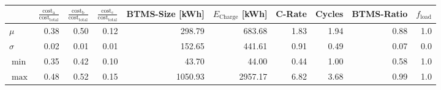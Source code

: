 \begin{tabular}{lrrrrrrrrr}
\toprule
{} &  $\frac{\text{cost}_\text{a}}{\text{cost}_\text{total}}$ &  $\frac{\text{cost}_\text{b}}{\text{cost}_\text{total}}$ &  $\frac{\text{cost}_\text{c}}{\text{cost}_\text{total}}$ &  BTMS-Size [\unit{\kWh}] &  $E_\text{Charge}$ [\unit{\kWh}] &  C-Rate &  Cycles &  BTMS-Ratio &  $f_\text{load}$ \\
\midrule
$\mu$    &                                               0.38 &                                               0.50 &                                               0.12 &                   298.79 &                           683.68 &    1.83 &    1.94 &        0.88 &              1.0 \\
$\sigma$ &                                               0.02 &                                               0.01 &                                               0.01 &                   152.65 &                           441.61 &    0.91 &    0.49 &        0.07 &              0.0 \\
$\min$   &                                               0.35 &                                               0.42 &                                               0.10 &                    43.70 &                            44.00 &    0.44 &    1.00 &        0.58 &              1.0 \\
$\max$   &                                               0.48 &                                               0.52 &                                               0.15 &                  1050.93 &                          2957.17 &    6.82 &    3.68 &        0.99 &              1.0 \\
\bottomrule
\end{tabular}
